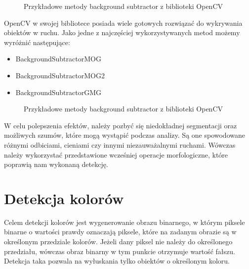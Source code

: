 \documentclass[a4paper,12pt,twoside,openany]{report}
\newcommand{\ImgPath}{.}
\begin{document}
\begin{figure}[H]
	\centering
	\caption{Przykładowe metody background subtractor z biblioteki OpenCV}
\end{figure}

OpenCV w swojej bibliotece posiada wiele gotowych rozwiązać do wykrywania obiektów w ruchu. Jako jedne z najczęściej wykorzystywanych metod możemy wyróżnić następujące:
\begin{itemize} 
	\item BackgroundSubtractorMOG
	\item BackgroundSubtractorMOG2
	\item BackgroundSubtractorGMG
\end{itemize} 
	
\begin{figure}[H]
	\centering
	\caption{Przykładowe metody background subtractor z biblioteki OpenCV}
\end{figure}

W celu polepszenia efektów, należy pozbyć się niedokładnej segmentacji oraz możliwych szumów,  które mogą wystąpić podczas analizy. Są one spowodowane różnymi odbiciami, cieniami czy innymi niezauważalnymi ruchami. Wówczas należy wykorzystać przedstawione wcześniej operacje morfologiczne, które poprawią nam wykonaną detekcję.

\section{Detekcja kolorów}
Celem detekcji kolorów jest wygenerowanie obrazu binarnego, w którym piksele binarne  o wartości prawdy oznaczają piksele, które na zadanym obrazie są w określonym przedziale kolorów. Jeżeli dany piksel nie należy do określonego  przedziału, wówczas obraz binarny w tym punkcie otrzymuje wartość fałszu. Detekcja taka pozwala na wyłuskania tylko obiektów o określonym koloru.
\end{document}
